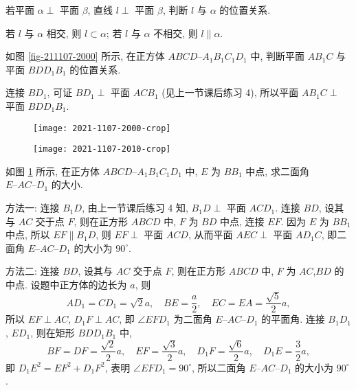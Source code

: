 \begin{exercise}
    若平面 $\alpha\perp$ 平面 $\beta$, 直线 $l\perp$ 平面 $\beta$, 判断 $l$ 与 $\alpha$ 的位置关系.
\end{exercise}
\beginsolution
    若 $l$ 与 $\alpha$ 相交, 则 $l\subset \alpha$; 若 $l$ 与 $\alpha$ 不相交, 则 $l\parallel \alpha$.
\endsolution

\begin{exercise}
    如图 \ref{fig-211107-2000} 所示, 在正方体 $ABCD\text{--}A_1 B_1 C_1 D_1$ 中, 判断平面 $AB_1 C$ 与平面 $BDD_1 B_1$ 的位置关系.
\end{exercise}
\beginsolution
    连接 $BD_1$, 可证 $BD_1\perp$ 平面 $ACB_1$ (见上一节课后练习 4), 所以平面 $AB_1 C\perp$ 平面 $BDD_1 B_1$.
\endsolution

\begin{figure}[htb]
    \small\centering
    \begin{minipage}[b]{0.45\linewidth}
        \centering
        \texttt{[image: 2021-1107-2000-crop]}
        \caption{}\label{fig-211107-2000}
    \end{minipage}
    \hskip 0.5cm
    \begin{minipage}[b]{0.45\linewidth}
        \centering
        \texttt{[image: 2021-1107-2010-crop]}
        \caption{}\label{fig-211107-2010}
    \end{minipage}
\end{figure}

\begin{exercise}
    如图 \ref{fig-211107-2010} 所示, 在正方体 $ABCD\text{--}A_1 B_1 C_1 D_1$ 中, $E$ 为 $BB_1$ 中点, 求二面角 $E\text{--}AC\text{--}D_1$ 的大小.
\end{exercise}
\beginsolution
    方法一: 连接 $B_1D$, 由上一节课后练习 4 知, $B_1D\perp$ 平面 $ACD_1$. 连接 $BD$, 设其与 $AC$ 交于点 $F$, 则在正方形 $ABCD$ 中, $F$ 为 $BD$ 中点, 连接 $EF$. 因为 $E$ 为 $BB_1$ 中点, 所以 $EF\parallel B_1D$, 则 $EF\perp$ 平面 $ACD$, 从而平面 $AEC\perp$ 平面 $AD_1C$, 即二面角 $E\text{--}AC\text{--}D_1$ 的大小为 $90^\circ$. 

    方法二: 连接 $BD$, 设其与 $AC$ 交于点 $F$, 则在正方形 $ABCD$ 中, $F$ 为 $AC$,$BD$ 的中点. 设题中正方体的边长为 $a$, 则
    \[AD_1=CD_1= \sqrt2a,\quad BE=\frac{a}2,\quad
        EC=EA= \frac{\sqrt5}2 a,\]
    所以 $EF\perp AC$, $D_1F\perp AC$, 
    即 $\angle EFD_1$ 为二面角 $E\text{--}AC\text{--}D_1$ 的平面角. 连接 $B_1D_1$, $ED_1$, 则在矩形 $BDD_1B_1$ 中, 
    \[BF= DF= \frac{\sqrt2}2 a,\quad 
        EF= \frac{\sqrt3}2 a,\quad
        D_1F= \frac{\sqrt6}2 a,\quad
        D_1E= \frac32 a,\]
    即 $D_1E^2= EF^2+ D_1F^2$, 表明 $\angle EFD_1= 90^\circ$, 所以二面角 $E\text{--}AC\text{--}D_1$ 的大小为 $90^\circ$.
\endsolution
    
